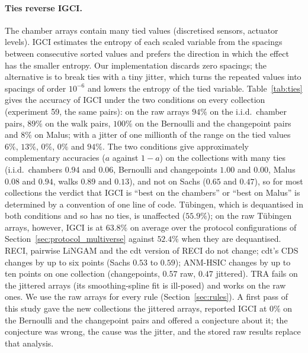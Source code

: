 \paragraph{Ties reverse IGCI.} The chamber arrays contain many tied values (discretised sensors, actuator levels). IGCI estimates the entropy of each scaled variable from the spacings between consecutive sorted values and prefers the direction in which the effect has the smaller entropy. Our implementation discards zero spacings; the alternative is to break ties with a tiny jitter, which turns the repeated values into spacings of order $10^{-6}$ and lowers the entropy of the tied variable. Table~\ref{tab:ties} gives the accuracy of IGCI under the two conditions on every collection (experiment 59, the same pairs): on the raw arrays $94\%$ on the i.i.d.\ chamber pairs, $89\%$ on the walk pairs, $100\%$ on the Bernoulli and the changepoint pairs and $8\%$ on Malus; with a jitter of one millionth of the range on the tied values $6\%$, $13\%$, $0\%$, $0\%$ and $94\%$. The two conditions give approximately complementary accuracies ($a$ against $1-a$) on the collections with many ties (i.i.d.\ chambers $0.94$ and $0.06$, Bernoulli and changepoints $1.00$ and $0.00$, Malus $0.08$ and $0.94$, walks $0.89$ and $0.13$), and not on Sachs ($0.65$ and $0.47$), so for most collections the verdict that IGCI is ``best on the chambers'' or ``best on Malus'' is determined by a convention of one line of code. T\"ubingen, which is dequantised in both conditions and so has no ties, is unaffected ($55.9\%$); on the raw T\"ubingen arrays, however, IGCI is at $63.8\%$ on average over the protocol configurations of Section~\ref{sec:protocol_multiverse} against $52.4\%$ when they are dequantised. RECI, pairwise LiNGAM and the cdt version of RECI do not change; cdt's CDS changes by up to six points (Sachs $0.53$ to $0.59$); ANM-HSIC changes by up to ten points on one collection (changepoints, $0.57$ raw, $0.47$ jittered). TRA fails on the jittered arrays (its smoothing-spline fit is ill-posed) and works on the raw ones. We use the raw arrays for every rule (Section~\ref{sec:rules}). A first pass of this study gave the new collections the jittered arrays, reported IGCI at $0\%$ on the Bernoulli and the changepoint pairs and offered a conjecture about it; the conjecture was wrong, the cause was the jitter, and the stored raw results replace that analysis.

